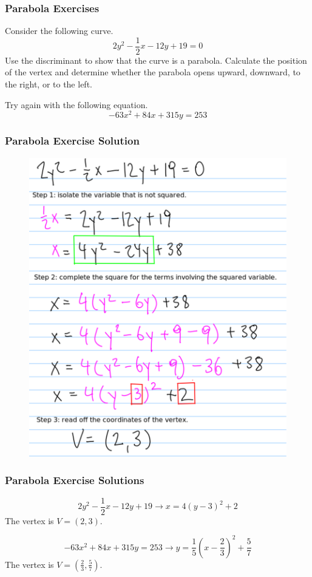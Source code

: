 \documentclass[xcolor=dvipsnames]{beamer}
\begin{document}
\begin{frame}
  \frametitle{Parabola Exercises}
Consider the following curve.
\begin{equation}
  \label{eq:eicaemae}
  2y^{2}-\frac{1}{2}x-12y+19=0
\end{equation}
Use the discriminant to show that the curve is a parabola. Calculate
the position of the vertex and determine whether the parabola opens
upward, downward, to the right, or to the left. 

\medskip

Try again with the following equation.
\begin{equation}
  \label{eq:xohsheco}
-63x^{2}+84x+315y=253
\end{equation}
\end{frame}

\begin{frame}
  \frametitle{Parabola Exercise Solution}
  \begin{figure}[h]
    \includegraphics[scale=.4]{./parabola.eps}
  \end{figure}
\end{frame}

\begin{frame}
  \frametitle{Parabola Exercise Solutions}
\begin{equation}
  \label{eq:zeiquahn}
  2y^{2}-\frac{1}{2}x-12y+19\longrightarrow{}x=4(y-3)^{2}+2
\end{equation}
The vertex is $V=(2,3)$.

\medskip

\begin{equation}
  \label{eq:kaitoohe}
-63x^{2}+84x+315y=253\longrightarrow{}y=\frac{1}{5}\left(x-\frac{2}{3}\right)^{2}+\frac{5}{7}
\end{equation}
The vertex is $V=\left(\frac{2}{3},\frac{5}{7}\right)$.
\end{frame}
\end{document}
